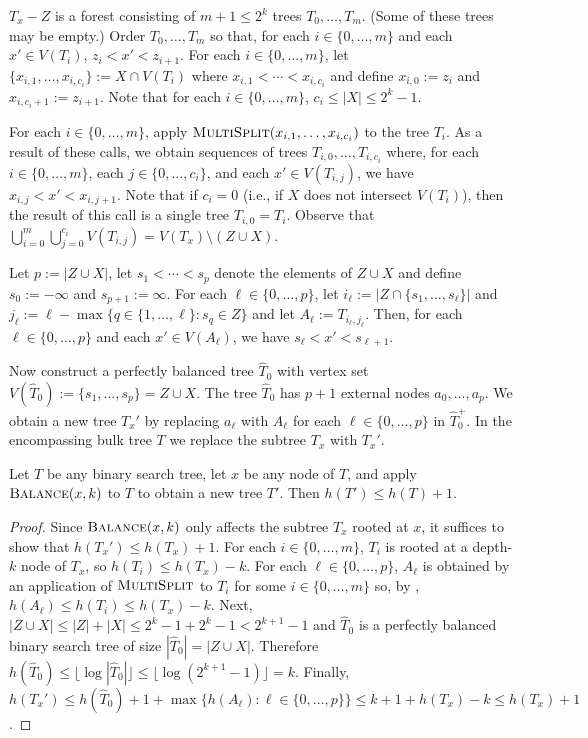 \documentclass[kpfonts]{patmorin}
\let\le\leqslant
\begin{document}
$T_x-Z$ is a forest consisting of $m+1\le 2^{k}$ trees $T_0,\dots,T_m$. (Some of these trees may be empty.)  Order $T_{0},\dots,T_m$ so that, for each $i\in\{0,\dots,m\}$ and each $x'\in V(T_i)$, $z_i< x' < z_{i+1}$.  For each $i\in\{0,\dots,m\}$, let $\{x_{i,1},\dots,x_{i,c_i}\}:=X\cap V(T_i)$ where $x_{i,1}<\cdots<x_{i,c_i}$ and define $x_{i,0}:=z_i$ and $x_{i,c_i+1}:=z_{i+1}$. Note that for each $i\in\{0,\dots,m\}$, $c_i\le |X|\le 2^k-1$.

For each $i\in\{0,\dots,m\}$, apply $\textsc{MultiSplit}(x_{i,1},\dots,x_{i,c_i})$ to the tree $T_i$.  As a result of these calls, we obtain sequences of trees $T_{i,0},\dots,T_{i,c_i}$ where, for each $i\in\{0,\dots,m\}$, each $j\in\{0,\dots,c_i\}$, and each $x'\in V(T_{i,j})$, we have $x_{i,j}<x'<x_{i,j+1}$.  Note that if $c_i=0$ (i.e., if $X$ does not intersect $V(T_i)$), then the result of this call is a single tree $T_{i,0}=T_i$.
Observe that $\bigcup_{i=0}^m\bigcup_{j=0}^{c_i} V(T_{i,j}) = V(T_x)\setminus (Z\cup X)$. 

Let $p := |Z\cup X|$, let $s_1<\cdots< s_p$ denote the elements of $Z\cup X$ and define $s_0 := -\infty$ and $s_{p+1} := \infty$.  For each $\ell\in\{0,\dots,p\}$, let $i_\ell:=|Z\cap \{s_1,\dots,s_\ell\}|$ and $j_\ell:= \ell - \max\{ q\in\{1,\dots,\ell\}: s_q\in Z\}$ and let $A_\ell:=T_{i_\ell,j_\ell}$.   Then, for each $\ell\in \{0,\dots,p\}$ and each $x'\in V(A_\ell)$, we have $s_\ell < x' < s_{\ell+1}$.

Now construct a perfectly balanced tree $\hat{T}_0$ with vertex set $V(\hat{T}_0):=\{s_1,\dots,s_p\}=Z\cup X$.  The tree $\hat{T}_0$ has $p+1$ external nodes $a_0,\dots,a_p$.  We obtain a new tree $T_x'$ by replacing $a_\ell$ with $A_\ell$ for each $\ell\in\{0,\dots,p\}$ in $\hat{T}_0^+$.  In the encompassing bulk tree $T$ we replace the subtree $T_x$ with $T_x'$.

\begin{lem}
  Let $T$ be any binary search tree, let $x$ be any node of $T$, and apply $\textsc{Balance}(x,k)$ to $T$ to obtain a new tree $T'$.  Then $h(T')\le h(T)+1$.
\end{lem}

\begin{proof}
  Since $\textsc{Balance}(x,k)$ only affects the subtree $T_x$ rooted at $x$, it suffices to show that $h(T_x')\le h(T_x)+1$.  For each $i\in\{0,\dots, m\}$, $T_i$ is rooted at a depth-$k$ node of $T_x$, so $h(T_i)\le h(T_x)-k$. For each $\ell \in\{0,\dots,p\}$, $A_\ell$ is obtained by an application of $\textsc{MultiSplit}$ to $T_i$ for some $i\in\{0,\dots,m\}$ so, by , $h(A_\ell)\le h(T_i)\le h(T_x)-k$.  Next, $|Z\cup X|\le |Z|+|X| \le 2^k-1 + 2^k-1 < 2^{k+1}-1$ and $\hat{T}_0$ is a perfectly balanced binary search tree of size $|\hat{T}_0|=|Z\cup X|$.  Therefore $h(\hat{T}_0)\le \lfloor\log|\hat{T}_0|\rfloor\le \lfloor\log(2^{k+1}-1)\rfloor = k$.  Finally, $h(T_x')\le h(\hat{T}_0)+1 +\max \{h(A_\ell):\ell\in\{0,\dots,p\}\} \le k +1 + h(T_x) - k\le h(T_x)+1$.
\end{proof}
\end{document}
